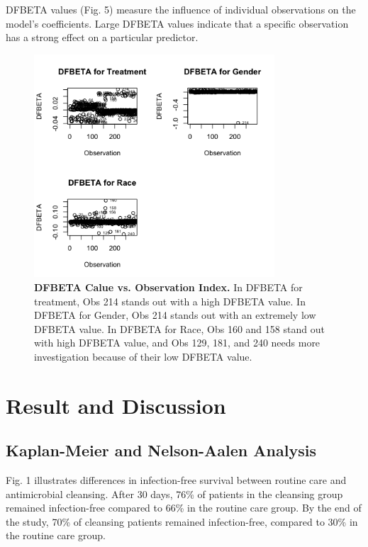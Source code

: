 \documentclass[12pt]{article}
\begin{document}
DFBETA values (Fig. 5) measure the influence of individual observations on the model’s coefficients. Large DFBETA values indicate that a specific observation has a strong effect on a particular predictor. 

\begin{figure}[H]
    \centering
    \includegraphics[width=0.8\textwidth]{plots/dfbeta.png}
    \caption{\textbf{DFBETA Calue vs. Observation Index. } In DFBETA for treatment, Obs 214 stands out with a high DFBETA value. In DFBETA for Gender, Obs 214 stands out with an extremely low DFBETA value. In DFBETA for Race, Obs 160 and 158 stand out with high DFBETA value, and Obs 129, 181, and 240 needs more investigation because of their low DFBETA value.}
        \end{figure}

\section*{Result and Discussion}
\subsection*{Kaplan-Meier and Nelson-Aalen Analysis}

Fig. 1 illustrates differences in infection-free survival between routine care and antimicrobial cleansing. After 30 days, 76\% of patients in the cleansing group remained infection-free compared to 66\% in the routine care group. By the end of the study, 70\% of cleansing patients remained infection-free, compared to 30\% in the routine care group. 
\end{document}
